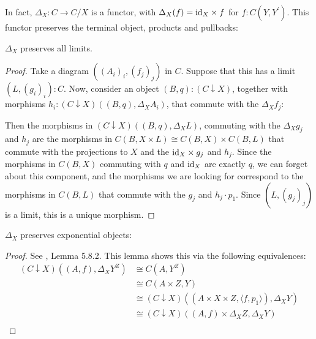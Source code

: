 In fact, $ \Delta_X : C \to C / X $ is a functor, with $ \Delta_X(f) = \text{id}_{X} \times f $ for $ f: C(Y, Y^\prime) $. This functor preserves the terminal object, products and pullbacks:
\begin{lemma}\label{lem:delta-limits}
  $ \Delta_X $ preserves all limits.
\end{lemma}
\begin{proof}
  Take a diagram $ ((A_i)_i, (f_j)_j) $ in $ C $. Suppose that this has a limit $ (L, (g_i)_i) : C $. Now, consider an object $ (B, q) : (C \downarrow X) $, together with morphisms $ h_i : (C \downarrow X)((B, q), \Delta_X A_i) $, that commute with the $ \Delta_X f_j $:
  \begin{center}
  \end{center}
  Then the morphisms in $ (C \downarrow X)((B, q), \Delta_X L) $, commuting with the $ \Delta_X g_j $ and $ h_j $ are the morphisms in $ C(B, X \times L) \cong C(B, X) \times C(B, L) $ that commute with the projections to $ X $ and the $ \text{id}_{X} \times g_j $ and $ h_j $. Since the morphisms in $ C(B, X) $ commuting with $ q $ and $ \text{id}_{X} $ are exactly $ q $, we can forget about this component, and the morphisms we are looking for correspond to the morphisms in $ C(B, L) $ that commute with the $ g_j $ and $ h_j \cdot p_1 $. Since $ (L, (g_j)_j) $ is a limit, this is a unique morphism.
\end{proof}

\begin{lemma}\label{lem:delta-exponentials}
  $ \Delta_X $ preserves exponential objects:
\end{lemma}
\begin{proof}
  See \cite{borceux-3}, Lemma 5.8.2. This lemma shows this via the following equivalences:
  \begin{align*}
    (C \downarrow X)((A, f), \Delta_X Y^Z) &\cong C(A, Y^Z)\\
    &\cong C(A \times Z, Y)\\
    &\cong (C \downarrow X)((A \times X \times Z, \langle f, p_1 \rangle), \Delta_X Y)\\
    &\cong (C \downarrow X)((A, f) \times \Delta_X Z, \Delta_X Y)\\
  \end{align*}
\end{proof}

